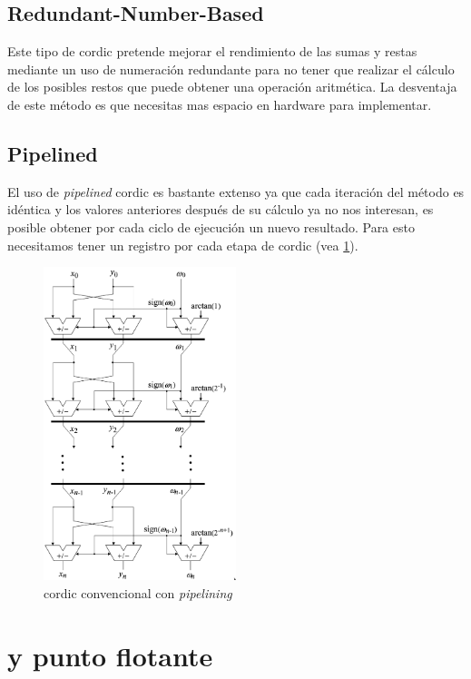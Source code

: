 \subsection{Redundant-Number-Based }
Este tipo de \gls{cordic} pretende mejorar el rendimiento de las sumas y restas mediante un uso de numeración redundante para no tener que realizar el cálculo de los posibles restos que puede obtener una operación aritmética. La desventaja de este método es que necesitas mas espacio en hardware para implementar.

\subsection{Pipelined }
El uso de \textit{pipelined} \gls{cordic} es bastante extenso ya que cada iteración del método es idéntica y los valores anteriores después de su cálculo ya no nos interesan, es posible obtener por cada ciclo de ejecución un nuevo resultado. Para esto necesitamos tener un registro por cada etapa de \gls{cordic} (vea \ref{graf:2009-CORDIC_pipelined}).

\begin{figure}[ht]
	\centering
	\includegraphics[width=0.50\textwidth]{archivos/CORDIC/2009-CORDIC_pipelined.png}
	\caption{\gls{cordic} convencional con \textit{pipelining}}
	\label{graf:2009-CORDIC_pipelined}
\end{figure}

\section{ y punto flotante}

